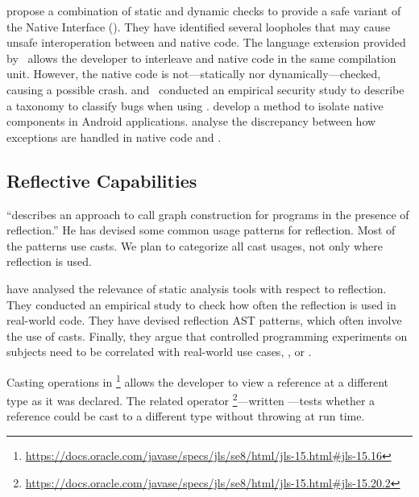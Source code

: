 \cite{tanSafeJavaNative2006} propose a combination of static and dynamic checks to provide a safe variant of the \java{} Native Interface (\jni{}).
They have identified several loopholes that may cause unsafe interoperation between \java{} and native code.
The language extension provided by~\cite{Bubak00creatingjava}
allows the developer to interleave \java{} and native code in the same compilation unit.
However, the native code is not---statically nor dynamically---checked,
causing a possible \jvm{} crash.
\cite{tanEmpiricalSecurityStudy2008} and~\cite{kondohFindingBugsJava2008}
conducted an empirical security study to describe a taxonomy to classify bugs when using \jni{}.
\cite{sunNativeGuardProtectingAndroid2014} develop a method to isolate native components in Android applications.
\cite{liFindingBugsExceptional2009} analyse the discrepancy between how exceptions are handled in native code and \java{}.

\subsection{Reflective Capabilities}
\label{sec:literature-review:casting}

\cite{livshitsImprovingSoftwareSecurity2006,livshitsReflectionAnalysisJava2005} ``describes an approach to call graph construction for \java{} programs in the presence of reflection.''
He has devised some common usage patterns for reflection.
Most of the patterns use casts.
We plan to categorize all cast usages,
not only where reflection is used.

\cite{landmanChallengesStaticAnalysis2017} have analysed the relevance of
static analysis tools with respect to reflection.
They conducted an empirical study to check how often the reflection
\api{} is used in real-world code.
They have devised reflection AST patterns,
which often involve the use of casts.
Finally, they argue that controlled programming experiments on
subjects need to be correlated with real-world use cases,
\eg, \github{} or \mavencentral{}.

Casting operations in \java{}%
\footnote{\url{https://docs.oracle.com/javase/specs/jls/se8/html/jls-15.html\#jls-15.16}}
allows the developer to view a reference at a different type as it was declared.
The related  operator%
\footnote{\url{https://docs.oracle.com/javase/specs/jls/se8/html/jls-15.html\#jls-15.20.2}}---written ---tests whether a reference  could be cast to a different type  without
throwing  at run time.

